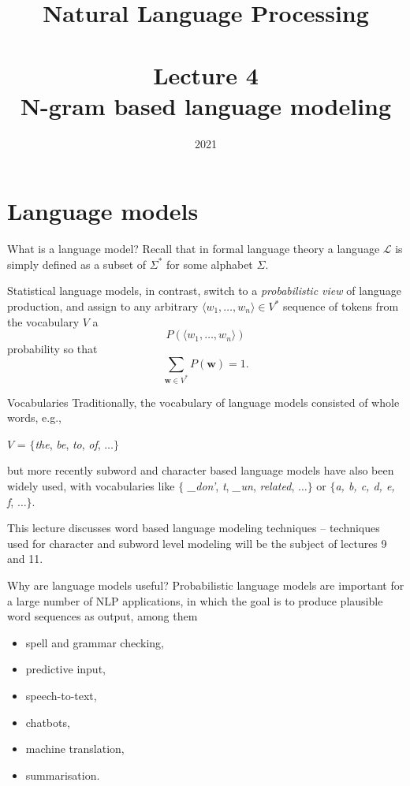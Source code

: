 \documentclass[style=upen, size=14pt]{powerdot}
\theoremstyle{definition}
\begin{document}
\title{Natural Language Processing\\~~\\Lecture 4\\N-gram based language modeling}

\date{2021}
\maketitle

\section{Language models}

\begin{slide}[toc=What is an LM?]{What is a language model?}
  Recall that in formal language theory a language $\mathcal L$ is simply
  defined as a subset of $\Sigma^*$ for some alphabet $\Sigma$.\bigskip

  Statistical language models, in contrast, switch to a \emph{probabilistic
    view} of language production, and assign to any arbitrary
  $\langle w_1,\dots, w_n\rangle \in V^*$ sequence of tokens from the vocabulary
  $V$ a
  $$P(\langle w_1,\dots, w_n\rangle)$$ probability so that
  $$
  \sum_{\mathbf{w}\in V^*} P(\mathbf{w}) = 1.
  $$
\end{slide}

\begin{slide}[toc=]{Vocabularies}
  Traditionally, the vocabulary of language models consisted of whole words,
  e.g.,
  \begin{center}
    $V$ = $\{$\emph{the}, \emph{be}, \emph{to}, \emph{of}, $\dots\}$
  \end{center}
  but more recently subword and character based language models have also been
  widely used, with vocabularies like $\{$ \emph{\_don'}, \emph{t}, \emph{\_un},
  \emph{related}, $\dots\}$ or $\{$\emph{a, b, c, d, e, f}, $\dots\}$.\bigskip

  This lecture discusses word based language modeling techniques -- techniques
  used for character and subword level modeling will be the subject of lectures
  9 and 11.
\end{slide}

\begin{slide}[toc=Why are LMs useful?]{Why are language models useful?}
  Probabilistic language models are important for a large number of NLP
  applications, in which the goal is to produce plausible word sequences as
  output, among them
  \begin{itemize}
  \item spell and grammar checking,
  \item predictive input,
  \item speech-to-text,
  \item chatbots,
  \item machine translation,
  \item summarisation.
  \end{itemize}
\end{slide}
\end{document}

